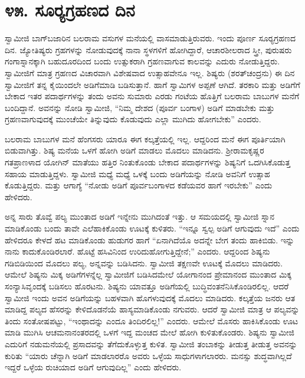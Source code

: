 
\chapter*{೪೫. ಸೂರ‍್ಯಗ್ರಹಣದ ದಿನ}

ಸ್ವಾಮೀಜಿ ಬಾಗ್‍ಬಜಾರಿನ ಬಲರಾಮ ವಸುಗಳ ಮನೆಯಲ್ಲಿ ವಾಸಮಾಡುತ್ತಿರುವರು. ಇಂದು ಪೂರ್ಣ ಸೂರ‍್ಯಗ್ರಹಣದ ದಿನ. ಜ್ಯೋತಿಷ್ಯರು ಗ್ರಹಗಳನ್ನು ನೋಡುವುದಕ್ಕೆ ನಾನಾ ಸ್ಥಳಗಳಿಗೆ ಹೋಗಿದ್ದಾರೆ, ಆಚಾರಶೀಲರಾದ ಸ್ತ್ರೀ, ಪುರುಷರು ಗಂಗಾಸ್ನಾನಕ್ಕಾಗಿ ಬಹುದೂರದಿಂದ ಬಂದು ಉತ್ಸುಕರಾಗಿ ಗ್ರಹಣವಾಗುವ ಕಾಲವನ್ನು ಎದುರು ನೋಡುತ್ತಿದ್ದರು. ಸ್ವಾಮೀಜಿಗೆ ಮಾತ್ರ ಗ್ರಹಣದ ವಿಚಾರವಾಗಿ ವಿಶೇಷವಾದ ಉತ್ಸಾಹವೇನೂ ಇಲ್ಲ. ಶಿಷ್ಯರು (ಶರತ್‍ಚಂದ್ರನು) ಈ ದಿನ ಸ್ವಾಮೀಜಿಗೆ ತನ್ನ ಕೈಯಿಂದಲೇ ಅಡಿಗೆಮಾಡಿ ಬಡಿಸುತ್ತಾನೆ. ಹಾಗೆ ಸ್ವಾಮಿಗಳ ಅಪ್ಪಣೆ ಆಗಿದೆ. ತರಕಾರಿ ಮತ್ತು ಅಡಿಗೆಗೆ ಬೇಕಾದ ಇತರ ಪದಾರ್ಥಗಳನ್ನು ತಂದು ಅವನು ಸುಮಾರು ಎರಡು ಗಂಟೆಯ ಹೊತ್ತಿಗೆ ಬಲರಾಮ ಬಾಬುಗಳ ಮನೆಗೆ ಬಂದಿದ್ದಾನೆ. ಅವನನ್ನು ನೋಡಿ ಸ್ವಾಮೀಜಿ, “ನಿಮ್ಮ ದೇಶದ (ಪೂರ್ವ ಬಂಗಾಳ) ಅಡಿಗೆ ಮಾಡಬೇಕು ಮತ್ತು ಗ್ರಹಣವಾಗುವುದಕ್ಕೆ ಮುಂಚೆಯೇ ತಿನ್ನುವುದು ಕೊಡುವುದು ಎಲ್ಲಾ ಮುಗಿದು ಹೋಗಬೇಕು” ಎಂದರು. 

 ಬಲರಾಮ ಬಾಬುಗಳ ಮನೆ ಹೆಂಗಸರು ಯಾರೂ ಈಗ ಕಲ್ಕತ್ತೆಯಲ್ಲಿ ಇಲ್ಲ. ಆದ್ದರಿಂದ ಮನೆ ಈಗ ಪೂರ್ತಿಯಾಗಿ ಬಿಡುವಾಗಿತ್ತು. ಶಿಷ್ಯ ಮನೆಯ ಒಳಗೆ ಹೋಗಿ ಅಡಿಗೆ ಮಾಡಲು ಮೊದಲು ಮಾಡಿದನು. ಶ‍್ರೀರಾಮಕೃಷ್ಣರ ಗತಪ್ರಾಣಳಾದ ಯೋಗಿನ್ ಮಾತೆಯು ಹತ್ತಿರ ನಿಂತುಕೊಂಡು ಬೇಕಾದ ಪದಾರ್ಥಗಳನ್ನು ಶಿಷ್ಯನಿಗೆ ಒದಗಿಸಿಕೊಡುತ್ತ ಸಹಾಯ ಮಾಡುತ್ತಿದ್ದಳು. ಸ್ವಾಮೀಜಿ ಮಧ್ಯೆ ಮಧ್ಯೆ ಒಳಕ್ಕೆ ಬಂದು ಅಡಿಗೆಯನ್ನು ನೋಡಿ ಅವನಿಗೆ ಉತ್ಸಾಹ ಕೊಡುತ್ತಿದ್ದರು. ಮತ್ತು ಆಗಾಗ್ಯೆ “ನೋಡು ಅಡಿಗೆ ಪೂರ್ವಬಂಗಾಳದ ಕಡೆಯವರ ಹಾಗೆ ಇರಬೇಕು” ಎಂದು ಹೇಳಿದರು. 

 ಅನ್ನ ಸಾರು ತೊವ್ವೆ ಪಲ್ಯ ಮುಂತಾದ ಅಡಿಗೆ ಇನ್ನೇನು ಮುಗಿದಂತೆ ಇತ್ತು. ಆ ಸಮಯದಲ್ಲಿ ಸ್ವಾಮೀಜಿ ಸ್ನಾನ ಮಾಡಿಕೊಂಡು ಬಂದು ತಾವೇ ಎಲೆಹಾಕಿಕೊಂಡು ಊಟಕ್ಕೆ ಕುಳಿತರು. “ಇನ್ನೂ ಸ್ವಲ್ಪ ಅಡಿಗೆ ಆಗುವುದು ಇದೆ” ಎಂದು ಹೇಳಿದರೂ ಕೇಳದೆ ಹಟ ಮಾಡಿಕೊಂಡು ಹುಡುಗರ ಹಾಗೆ “ಏನಾಗಿದೆಯೊ ಅದನ್ನೇ ಬೇಗ ತಂದು ಹಾಕಿಬಿಡು. ಇನ್ನು ನಾನು ಕಾದುಕೊಂಡಿರಲಾರೆ. ಹೊಟ್ಟೆ ಹಸಿವಿನಿಂದ ಉರಿದುಹೋಗುತ್ತಿದ್ದೇನೆ;” ಎಂದರು. ಆದ್ದರಿಂದ ಶಿಷ್ಯನು ಗಡಿಬಿಡಿಯಿಂದ ಮೊದಲು ಪಲ್ಯ, ಅನ್ನವನ್ನು ಬಡಿಸಿದನು. ಸ್ವಾಮೀಜಿ ತಕ್ಷಣವೇ ಊಟಕ್ಕೆ ಮೊದಲು ಮಾಡಿದರು. ಆಮೇಲೆ ಶಿಷ್ಯನು ಮಿಕ್ಕ ಅಡಿಗೆಗಳನ್ನೆಲ್ಲ ಸ್ವಾಮೀಜಿಗೆ ಬಡಿಸಿದಮೇಲೆ ಯೋಗಾನಂದ ಪ್ರೇಮಾನಂದ ಮುಂತಾದ ಮಿಕ್ಕ ಸಂನ್ಯಾಸಿವೃಂದಕ್ಕೆ ಬಡಿಸಲು ಹೊರಟನು. ಶಿಷ್ಯನು ಯಾವತ್ತೂ ಅಡಿಗೆಯಲ್ಲಿ ಬುದ್ಧಿವಂತನೆನಿಸಿಕೊಂಡಿರಲಿಲ್ಲ. ಆದರೆ ಸ್ವಾಮೀಜಿ ಇಂದು ಅವನ ಅಡಿಗೆಯನ್ನು ಬಹಳವಾಗಿ ಹೊಗಳುವುದಕ್ಕೆ ಮೊದಲು ಮಾಡಿದರು. ಕಲ್ಕತ್ತೆಯ ಜನರು ಆತ ಮಾಡಿದ್ದ ಪಲ್ಯದ ಹೆಸರನ್ನು ಕೇಳಿದೊಡನೆಯೆ ಹಾಸ್ಯಮಾಡಿಕೊಂಡು ನಗುವರು. ಆದರೆ ಸ್ವಾಮೀಜಿ ಮಾತ್ರ ಆ ಪಲ್ಯವನ್ನು ತಿಂದು ಸಂತೋಷಪಟ್ಟು, “ಇಂಥಾದನ್ನು ಎಂದೂ ತಿಂದಿರಲಿಲ್ಲ!” ಎಂದರು. ಆಮೇಲೆ ಮೊಸರು ಹಾಕಿಸಿಕೊಂಡು ಊಟ ಮಾಡಿ ಮುಗಿಸಿ ಆಚಮನಾನಂತರದಲ್ಲಿ ಒಳಗೆ ಇದ್ದ ಮಂಚದ ಮೇಲೆ ಹೋಗಿ ಕುಳಿತುಕೊಂಡರು. ಶಿಷ್ಯನು ಸ್ವಾಮೀಜಿ ಎದುರಿಗೆ ನಡುಮನೆಯಲ್ಲಿ ಪ್ರಸಾದವನ್ನು ತೆಗೆದುಕೊಳ್ಳುತ್ತ ಕುಳಿತ. ಸ್ವಾಮೀಜಿ ತಂಬಾಕನ್ನು ತೀಡುತ್ತ ತೀಡುತ್ತ ಅವನನ್ನು ಕುರಿತು “ಯಾರು ಚೆನ್ನಾಗಿ ಅಡಿಗೆ ಮಾಡಲಾರರೊ ಅವರು ಒಳ್ಳೆಯ ಸಾಧುಗಳಾಗಲಾರರು. ಮನಸ್ಸು ಶುದ್ಧವಾಗಿಲ್ಲದೆ ಇದ್ದರೆ ಒಳ್ಳೆಯ ರುಚಿಯಾದ ಅಡಿಗೆ ಆಗುವುದಿಲ್ಲ” ಎಂದು ಹೇಳಿದರು. 

